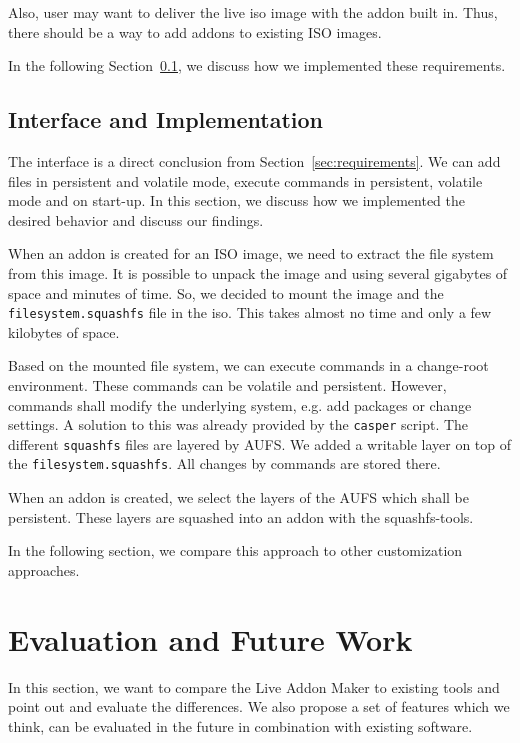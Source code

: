 \documentclass[english]{lni}
\begin{document}
Also, user may want to deliver the live iso image with the addon built in.
Thus, there should be a way to add addons to existing ISO images.

In the following Section~\ref{sec:implementation}, we discuss how we implemented these requirements.

\subsection{Interface and Implementation}
\label{sec:implementation}

The interface is a direct conclusion from Section~\ref{sec:requirements}.
We can add files in persistent and volatile mode, execute commands in persistent, volatile mode and on start-up.
In this section, we discuss how we implemented the desired behavior and discuss our findings.

When an addon is created for an ISO image, we need to extract the file system from this image.
It is possible to unpack the image and using several gigabytes of space and minutes of time.
So, we decided to mount the image and the \texttt{filesystem.squashfs} file in the iso.
This takes almost no time and only a few kilobytes of space.

Based on the mounted file system, we can execute commands in a change-root environment.
These commands can be volatile and persistent.
However, commands shall modify the underlying system, e.g. add packages or change settings.
A solution to this was already provided by the \texttt{casper} script.
The different \texttt{squashfs} files are layered by AUFS.
We added a writable layer on top of the \texttt{filesystem.squashfs}.
All changes by commands are stored there.

When an addon is created, we select the layers of the AUFS which shall be persistent.
These layers are squashed into an addon with the squashfs-tools.

In the following section, we compare this approach to other customization approaches.

\section{Evaluation and Future Work}

In this section, we want to compare the Live Addon Maker to existing tools and point out and evaluate the differences.
We also propose a set of features which we think, can be evaluated in the future in combination with existing software.
\end{document}
